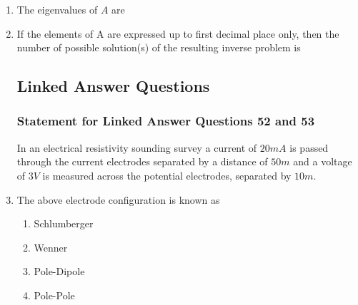 \documentclass[journal,12pt,onecolumn]{IEEEtran}
\theoremstyle{remark}
\begin{document}
\begin{enumerate}[start = 26 ]
        \item The eigenvalues of $A$ are \hfill{}
            \begin{enumerate}
            \end{enumerate}
        
        \item If the elements of A are expressed up to first decimal place only, then the number of possible solution(s) of the resulting inverse problem is \hfill{}
            \begin{enumerate}
            \end{enumerate}

\subsection*{Linked Answer Questions}
\subsubsection*{Statement for Linked Answer Questions 52 and 53}
In an electrical resistivity sounding survey a current of $20 mA$ is passed through the current electrodes separated by a distance of $50 m$ and a voltage of $3 V$ is measured across the potential electrodes, separated by $10 m$.

        \item The above electrode configuration is known as \hfill{}
            \begin{enumerate}
                    \item Schlumberger
                    \item Wenner
                    \item Pole-Dipole
                    \item Pole-Pole
            \end{enumerate}
        

\end{enumerate}
\end{document}
